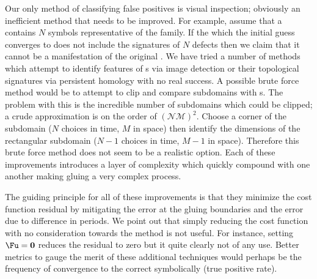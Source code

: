 Our only method of classifying false positives is visual inspection;
obviously an inefficient method that needs to be improved.
For example, assume that a {\brick}
contains $N$ symbols representative of the {} family. If the {\po}
which the initial guess converges to does not include the signatures of $N$
defects then we claim that it cannot be a manifestation of the original {\brick}.
We have tried a number of methods which
attempt to identify features of {\fpo}s via image detection
or their topological signatures via persistent homology with
no real success. A possible brute force method would be to attempt to clip
and compare subdomains with {\fpo}s. The problem with this
is the incredible number of subdomains which could be clipped; a crude
approximation is on the order of $\mathcal{(NM)^2}$. Choose a corner
of the subdomain ($N$ choices in time, $M$ in space) then identify the
dimensions of the rectangular subdomain ($N-1$ choices in time, $M-1$ in space).
Therefore this brute force method does not seem to be a realistic option.
Each of these improvements introduces a layer of complexity which
quickly compound with one another making gluing a very complex process.

The guiding principle for all of these improvements
is that they minimize the cost function residual  by
mitigating the error at the gluing boundaries and the error due to difference
in periods. We point out that simply reducing the cost function with no consideration
towards the method is not useful. For instance,
setting $\Fu=\mathbf{0}$ reduces the residual to zero but it quite clearly not of any use.
Better metrics to gauge the merit of these additional techniques would perhaps be
the frequency of convergence to the correct {\po} symbolically (true positive rate).


